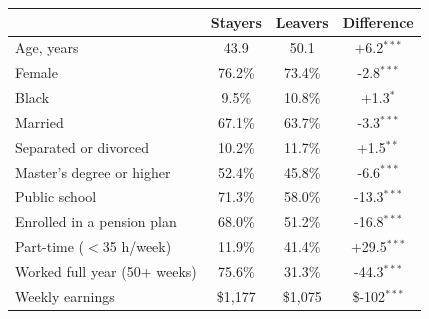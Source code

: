 \begin{tabular}{lccc}
\toprule
 & Stayers & Leavers & Difference \\
\midrule
Age, years & 43.9 & 50.1 & +6.2$^{***}$ \\
Female & 76.2\% & 73.4\% & -2.8$^{***}$ \\
Black & 9.5\% & 10.8\% & +1.3$^{*}$ \\
Married & 67.1\% & 63.7\% & -3.3$^{***}$ \\
Separated or divorced & 10.2\% & 11.7\% & +1.5$^{**}$ \\
Master's degree or higher & 52.4\% & 45.8\% & -6.6$^{***}$ \\
Public school & 71.3\% & 58.0\% & -13.3$^{***}$ \\
Enrolled in a pension plan & 68.0\% & 51.2\% & -16.8$^{***}$ \\
Part-time ($<$35 h/week) & 11.9\% & 41.4\% & +29.5$^{***}$ \\
Worked full year (50+ weeks) & 75.6\% & 31.3\% & -44.3$^{***}$ \\
Weekly earnings & \$1,177 & \$1,075 & \$-102$^{***}$ \\
\bottomrule
\end{tabular}
